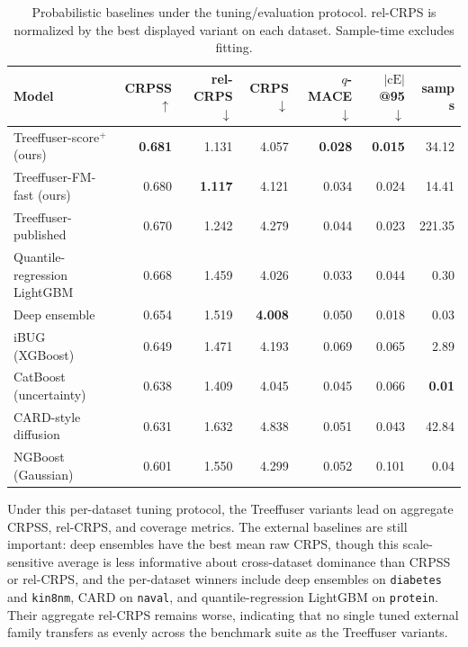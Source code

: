 \documentclass{tpm2026}
\begin{document}
\begin{table}[!h]
  \centering
  \caption{Probabilistic baselines under the tuning/evaluation protocol. rel-CRPS is normalized by the best displayed variant on each dataset. Sample-time excludes fitting.}\label{tab:competitors}
  \scriptsize
  \begin{tabular}{lrrrrrr}
    \toprule
    Model & CRPSS $\uparrow$ & rel-CRPS $\downarrow$ & CRPS $\downarrow$ & $q$-MACE $\downarrow$ & $|\text{cE}|$@95 $\downarrow$ & samp s \\
    \midrule
    Treeffuser-score$^+$ (ours)     & \textbf{0.681} & 1.131 & 4.057 & \textbf{0.028} & \textbf{0.015} & 34.12 \\
    Treeffuser-FM-fast (ours)       & 0.680 & \textbf{1.117} & 4.121 & 0.034 & 0.024 & 14.41 \\
    Treeffuser-published            & 0.670 & 1.242 & 4.279 & 0.044 & 0.023 & 221.35 \\
    Quantile-regression LightGBM    & 0.668 & 1.459 & 4.026 & 0.033 & 0.044 & 0.30 \\
    Deep ensemble                   & 0.654 & 1.519 & \textbf{4.008} & 0.050 & 0.018 & 0.03 \\
    iBUG (XGBoost)                  & 0.649 & 1.471 & 4.193 & 0.069 & 0.065 & 2.89 \\
    CatBoost (uncertainty)          & 0.638 & 1.409 & 4.045 & 0.045 & 0.066 & \textbf{0.01} \\
    CARD-style diffusion            & 0.631 & 1.632 & 4.838 & 0.051 & 0.043 & 42.84 \\
    NGBoost (Gaussian)              & 0.601 & 1.550 & 4.299 & 0.052 & 0.101 & 0.04 \\
    \bottomrule
  \end{tabular}
\end{table}

Under this per-dataset tuning protocol, the Treeffuser variants lead on aggregate CRPSS, rel-CRPS, and coverage metrics. The external baselines are still important: deep ensembles have the best mean raw CRPS, though this scale-sensitive average is less informative about cross-dataset dominance than CRPSS or rel-CRPS, and the per-dataset winners include deep ensembles on \texttt{diabetes} and \texttt{kin8nm}, CARD on \texttt{naval}, and quantile-regression LightGBM on \texttt{protein}. Their aggregate rel-CRPS remains worse, indicating that no single tuned external family transfers as evenly across the benchmark suite as the Treeffuser variants.
\end{document}
